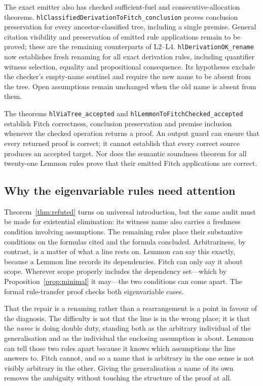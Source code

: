 \documentclass[11pt]{article}
\theoremstyle{plain}
\theoremstyle{definition}
\theoremstyle{remark}
\begin{document}
The exact emitter also has checked sufficient-fuel and consecutive-allocation
theorems. \verb|hlClassifiedDerivationToFitch_conclusion| proves conclusion
preservation for every ancestor-classified tree, including a single premise.
General citation visibility and preservation of emitted rule applications
remain to be proved; these are the remaining counterparts of L2--L4.
\verb|hlDerivationOK_rename| now establishes fresh renaming for all exact
derivation rules, including quantifier witness selection, equality and
propositional consequence. Its hypotheses exclude the checker's empty-name
sentinel and require the new name to be absent from the tree. Open assumptions
remain unchanged when the old name is absent from them.

The theorems \verb|hlViaTree_accepted| and
\verb|hlLemmonToFitchChecked_accepted| establish Fitch correctness,
conclusion preservation and premise inclusion whenever
the checked operation returns a proof. An output guard can ensure that
every returned proof is correct; it cannot establish that every correct source
produces an accepted target. Nor does the semantic soundness theorem for all
twenty-one Lemmon rules prove that their emitted Fitch applications are correct.

\subsection{Why the eigenvariable rules need attention}\label{sec:eigen}

Theorem~\ref{thm:refuted} turns on universal introduction, but the same audit
must be made for existential elimination: its witness name also carries a
freshness condition involving assumptions. The remaining rules place their
substantive conditions on the formulas cited and the formula concluded.
Arbitrariness, by contrast, is a matter of what a line rests on. Lemmon can
say this exactly, because a Lemmon line records its dependencies. Fitch can
only say it about scope. Wherever scope properly includes the dependency
set---which by Proposition~\ref{prop:minimal} it may---the two conditions can
come apart. The formal rule-transfer proof checks both eigenvariable cases.

That the repair is a renaming rather than a rearrangement is a point in
favour of the diagnosis. The difficulty is not that the line is in the wrong
place; it is that the \emph{name} is doing double duty, standing both as the
arbitrary individual of the generalisation and as the individual the enclosing
assumption is about. Lemmon can tell those two roles apart because it knows
which assumptions the line answers to. Fitch cannot, and so a name that is
arbitrary in the one sense is not visibly arbitrary in the other. Giving the
generalisation a name of its own removes the ambiguity without touching the
structure of the proof at all.
\end{document}
